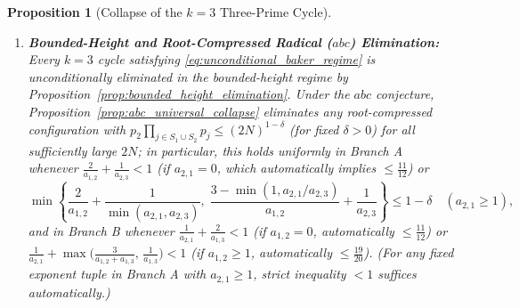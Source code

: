 \documentclass[11pt,a4paper]{article}
\newtheorem{proposition}[theorem]{Proposition}
\theoremstyle{definition}
\begin{document}
\begin{proposition}[Collapse of the $k=3$ Three-Prime Cycle]
\begin{enumerate}
    \begin{equation}
    \label{eq:k3_dual_K_identity}
    p_1^{a_{2,1}} - 1 = K p_2, \quad p_1^{a_{3,1}} p_2^{a_{3,2}-1} - 1 = K p_3, \quad \text{and} \quad K p_2^{a_{1,2}} + K p_1 + 1 = p_1^{a_{2,1} + a_{3,1}} p_2^{a_{3,2}-1},
    \end{equation}
    which unconditionally eliminates $a_{2,1} = 1$ and enforces the strict congruence:
    \begin{equation*}
    K^{a_{1,2}-1}(K p_1 + 1) \equiv (-1)^{a_{1,2}-1} \pmod{p_1^{a_{2,1}}}.
    \end{equation*}
    (Symmetrically, in Branch B with $a_{3,1} \ge 1$ and $a_{1,3} = 1$, there exists an even integer $K' \ge 2$ satisfying $p_2^{a_{1,2}} - 1 = K' p_1$, $p_1^{a_{3,1}-1} p_2^{a_{3,2}} - 1 = K' p_3$, $K' p_1^{a_{2,1}} + K' p_2 + 1 = p_1^{a_{3,1}-1} p_2^{a_{1,2} + a_{3,2}}$, and $K'^{a_{2,1}-1}(K' p_2 + 1) \equiv (-1)^{a_{2,1}-1} \pmod{p_2^{a_{1,2}}}$.)
    \item \textbf{Bounded-Height and Root-Compressed Radical ($abc$) Elimination:} Every $k = 3$ cycle satisfying \eqref{eq:unconditional_baker_regime} is unconditionally eliminated in the bounded-height regime by Proposition~\ref{prop:bounded_height_elimination}. Under the $abc$ conjecture, Proposition~\ref{prop:abc_universal_collapse} eliminates any root-compressed configuration with $p_2 \prod_{j \in S_1 \cup S_2} p_j \le (2N)^{1 - \delta}$ (for fixed $\delta > 0$) for all sufficiently large $2N$; in particular, this holds uniformly in Branch A whenever $\frac{2}{a_{1,2}} + \frac{1}{a_{2,3}} < 1$ (if $a_{2,1} = 0$, which automatically implies $\le \frac{11}{12}$) or
    \[
    \min\left\{ \frac{2}{a_{1,2}} + \frac{1}{\min(a_{2,1}, a_{2,3})}, \; \frac{3 - \min(1, a_{2,1}/a_{2,3})}{a_{1,2}} + \frac{1}{a_{2,3}} \right\} \le 1 - \delta \quad (a_{2,1} \ge 1),
    \]
    and in Branch B whenever $\frac{1}{a_{2,1}} + \frac{2}{a_{1,3}} < 1$ (if $a_{1,2} = 0$, automatically $\le \frac{11}{12}$) or $\frac{1}{a_{2,1}} + \max\bigl(\frac{3}{a_{1,2} + a_{1,3}}, \, \frac{1}{a_{1,3}}\bigr) < 1$ (if $a_{1,2} \ge 1$, automatically $\le \frac{19}{20}$). (For any fixed exponent tuple in Branch A with $a_{2,1} \ge 1$, strict inequality $< 1$ suffices automatically.)
\end{enumerate}
\end{proposition}
\end{document}
